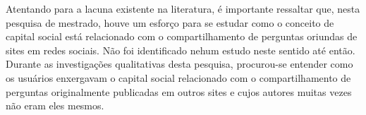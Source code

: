 Atentando para a lacuna existente na literatura, é importante ressaltar que, nesta pesquisa de mestrado, houve um esforço para se estudar como o conceito de capital social está relacionado com o compartilhamento de perguntas oriundas de sites \qa em redes sociais. Não foi identificado nehum estudo neste sentido até então. Durante as investigações qualitativas desta pesquisa, procurou-se entender como os usuários enxergavam o capital social relacionado com o compartilhamento de perguntas originalmente publicadas em outros sites e cujos autores muitas vezes não eram eles mesmos.